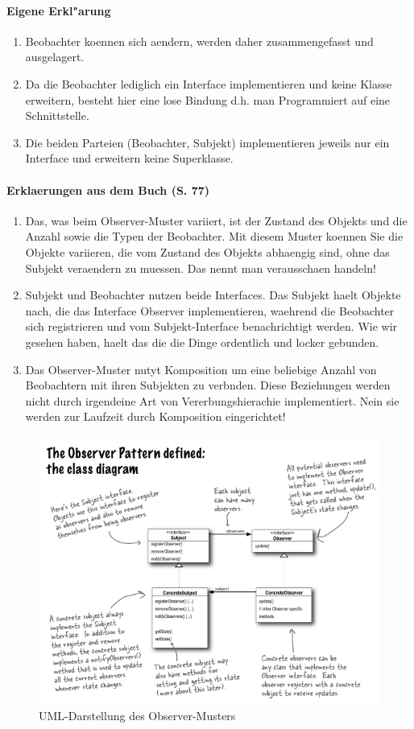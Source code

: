 \paragraph{Eigene Erkl"arung}
\begin{enumerate}
\item Beobachter koennen sich aendern, werden daher zusammengefasst und ausgelagert.
\item Da die Beobachter lediglich ein Interface implementieren und keine Klasse erweitern, besteht 
   hier eine lose Bindung d.h. man Programmiert auf eine Schnittstelle.
\item Die beiden Parteien (Beobachter, Subjekt) implementieren jeweils nur ein Interface und 
   erweitern keine Superklasse.
\end{enumerate}
   
\paragraph{Erklaerungen aus dem Buch (S. 77)}
\begin{enumerate}
\item Das, was beim Observer-Muster variiert, ist der Zustand des Objekts und die Anzahl sowie die 
   Typen der Beobachter. Mit diesem Muster koennen Sie die Objekte variieren, die vom Zustand des 
   Objekts abhaengig sind, ohne das Subjekt veraendern zu muessen. Das nennt man verausschaen 
   handeln!
\item Subjekt und Beobachter nutzen beide Interfaces. Das Subjekt haelt Objekte nach, die das 
   Interface Observer implementieren, waehrend die Beobachter sich registrieren und vom 
   Subjekt-Interface benachrichtigt werden. Wie wir gesehen haben, haelt das die die Dinge 
   ordentlich und locker gebunden. 
\item Das Observer-Muster nutyt Komposition um eine beliebige Anzahl von Beobachtern mit ihren 
   Subjekten zu verbnden. Diese Beziehungen werden nicht durch irgendeine Art von 
   Vererbungshierachie implementiert. Nein sie werden zur Laufzeit durch Komposition eingerichtet!
\end{enumerate}

\begin{figure}
	\centering
	\includegraphics{observer/img/observerUML}
	\caption{UML-Darstellung des Observer-Musters}
	\label{fig:observerUML}
\end{figure}
